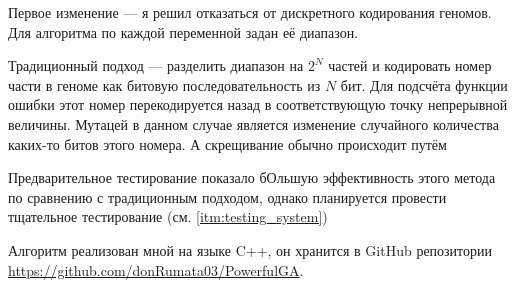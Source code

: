 Первое изменение — я решил отказаться от дискретного кодирования геномов.
Для алгоритма по каждой переменной задан её диапазон.

Традиционный подход — разделить диапазон на $2^N$ частей и кодировать номер части в геноме как битовую последовательность из $N$ бит.
Для подсчёта функции ошибки этот номер перекодируется назад в соответствующую точку непрерывной величины.
Мутацей в данном случае является изменение случайного количества каких-то битов этого номера.
А скрещивание обычно происходит путём

Предварительное тестирование показало бОльшую эффективность этого метода по сравнению с традиционным подходом, однако планируется провести тщательное тестирование (см. \ref{itm:testing_system})

Алгоритм реализован мной на языке C++, он хранится в GitHub репозитории \href{https://github.com/donRumata03/PowerfulGA}{https://github.com/donRumata03/PowerfulGA}.